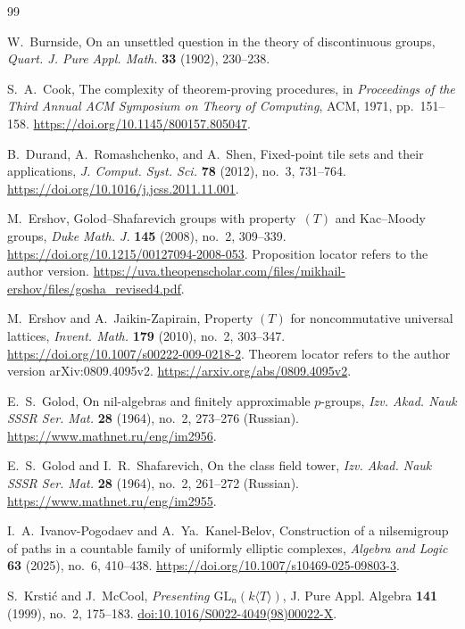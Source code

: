 \begin{thebibliography}{99}

W.~Burnside,
On an unsettled question in the theory of discontinuous groups,
\emph{Quart. J. Pure Appl. Math.} \textbf{33} (1902), 230--238.

S.~A.~Cook,
The complexity of theorem-proving procedures,
in \emph{Proceedings of the Third Annual ACM Symposium on Theory of
Computing}, ACM, 1971, pp.~151--158.
\url{https://doi.org/10.1145/800157.805047}.

B.~Durand, A.~Romashchenko, and A.~Shen,
Fixed-point tile sets and their applications,
\emph{J. Comput. Syst. Sci.} \textbf{78} (2012), no.~3, 731--764.
\url{https://doi.org/10.1016/j.jcss.2011.11.001}.

M.~Ershov,
Golod--Shafarevich groups with property~$(T)$ and Kac--Moody groups,
\emph{Duke Math. J.} \textbf{145} (2008), no.~2, 309--339.
\url{https://doi.org/10.1215/00127094-2008-053}.
Proposition locator refers to the author version.
\url{https://uva.theopenscholar.com/files/mikhail-ershov/files/gosha_revised4.pdf}.

M.~Ershov and A.~Jaikin-Zapirain,
Property $(T)$ for noncommutative universal lattices,
\emph{Invent. Math.} \textbf{179} (2010), no.~2, 303--347.
\url{https://doi.org/10.1007/s00222-009-0218-2}.
Theorem locator refers to the author version arXiv:0809.4095v2.
\url{https://arxiv.org/abs/0809.4095v2}.

E.~S.~Golod,
On nil-algebras and finitely approximable $p$-groups,
\emph{Izv. Akad. Nauk SSSR Ser. Mat.} \textbf{28} (1964), no.~2,
273--276 (Russian).
\url{https://www.mathnet.ru/eng/im2956}.

E.~S.~Golod and I.~R.~Shafarevich,
On the class field tower,
\emph{Izv. Akad. Nauk SSSR Ser. Mat.} \textbf{28} (1964), no.~2,
261--272 (Russian).
\url{https://www.mathnet.ru/eng/im2955}.

I.~A.~Ivanov-Pogodaev and A.~Ya.~Kanel-Belov,
Construction of a nilsemigroup of paths in a countable family of
uniformly elliptic complexes,
\emph{Algebra and Logic} \textbf{63} (2025), no.~6, 410--438.
\url{https://doi.org/10.1007/s10469-025-09803-3}.

S.~Krsti\'c and J.~McCool,
\emph{Presenting $\mathrm{GL}_n(k\langle T\rangle)$},
J. Pure Appl. Algebra \textbf{141} (1999), no.~2, 175--183.
\href{https://doi.org/10.1016/S0022-4049(98)00022-X}{doi:10.1016/S0022-4049(98)00022-X}.


\end{thebibliography}
